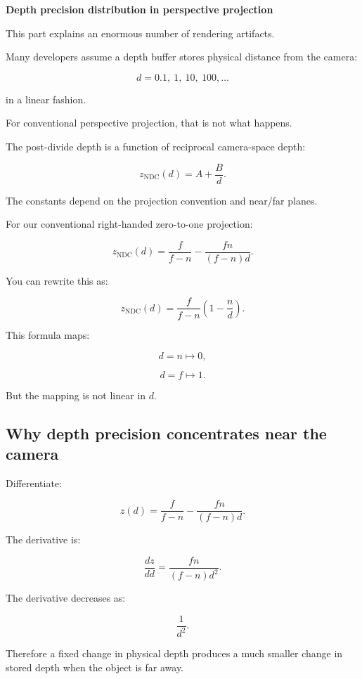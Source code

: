 \textbf{Depth precision distribution in perspective projection}

This part explains an enormous number of rendering artifacts.

Many developers assume a depth buffer stores physical distance from the camera:

\[
 d=0.1,\ 1,\ 10,\ 100,\ldots
\]

in a linear fashion.

For conventional perspective projection, that is not what happens.

The post-divide depth is a function of reciprocal camera-space depth:

\[
 \boxed{ z_{\mathrm{NDC}}(d)=A+\frac Bd }.
\]

The constants depend on the projection convention and near/far planes.

For our conventional right-handed zero-to-one projection:

\[
 \boxed{ z_{\mathrm{NDC}}(d) = \frac f{f-n} - \frac{fn}{(f-n)d} }.
\]

You can rewrite this as:

\[
 \boxed{ z_{\mathrm{NDC}}(d) = \frac f{f-n}\left(1-\frac nd\right) }.
\]

This formula maps:

\[
 d=n\mapsto0,
\]

\[
 d=f\mapsto1.
\]

But the mapping is not linear in \(d\).

\subsection{Why depth precision concentrates near the camera}\label{02-foundations-ii-ch033-why-depth-precision-concentrates-near-the-camera}

\hypertarget{02-foundations-ii-ch033-why-depth-precision-concentrates-near-the-camera}{}

Differentiate:

\[
 z(d)= \frac f{f-n} - \frac{fn}{(f-n)d}.
\]

The derivative is:

\[
 \boxed{ \frac{dz}{dd} = \frac{fn}{(f-n)d^2} }.
\]

The derivative decreases as:

\[
 \frac1{d^2}.
\]

Therefore a fixed change in physical depth produces a much smaller change in stored depth when the object is far away.

